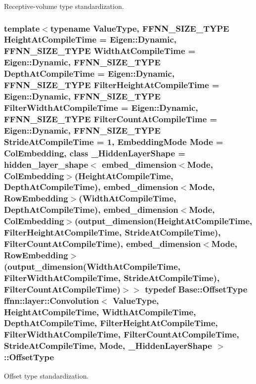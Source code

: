 Receptive-\/volume type standardization. 

\hypertarget{classffnn_1_1layer_1_1_convolution_a0ec0f3a4598c7286815f2fdd1e57e8ca}{
\subsubsection[{Offset\-Type}]{\setlength{\rightskip}{0pt plus 5cm}template$<$typename Value\-Type, F\-F\-N\-N\-\_\-\-S\-I\-Z\-E\-\_\-\-T\-Y\-P\-E Height\-At\-Compile\-Time = Eigen\-::\-Dynamic, F\-F\-N\-N\-\_\-\-S\-I\-Z\-E\-\_\-\-T\-Y\-P\-E Width\-At\-Compile\-Time = Eigen\-::\-Dynamic, F\-F\-N\-N\-\_\-\-S\-I\-Z\-E\-\_\-\-T\-Y\-P\-E Depth\-At\-Compile\-Time = Eigen\-::\-Dynamic, F\-F\-N\-N\-\_\-\-S\-I\-Z\-E\-\_\-\-T\-Y\-P\-E Filter\-Height\-At\-Compile\-Time = Eigen\-::\-Dynamic, F\-F\-N\-N\-\_\-\-S\-I\-Z\-E\-\_\-\-T\-Y\-P\-E Filter\-Width\-At\-Compile\-Time = Eigen\-::\-Dynamic, F\-F\-N\-N\-\_\-\-S\-I\-Z\-E\-\_\-\-T\-Y\-P\-E Filter\-Count\-At\-Compile\-Time = Eigen\-::\-Dynamic, F\-F\-N\-N\-\_\-\-S\-I\-Z\-E\-\_\-\-T\-Y\-P\-E Stride\-At\-Compile\-Time = 1, Embedding\-Mode Mode = Col\-Embedding, class \-\_\-\-Hidden\-Layer\-Shape = hidden\-\_\-layer\-\_\-shape$<$              embed\-\_\-dimension$<$\-Mode, Col\-Embedding$>$(\-Height\-At\-Compile\-Time, Depth\-At\-Compile\-Time),              embed\-\_\-dimension$<$\-Mode, Row\-Embedding$>$(\-Width\-At\-Compile\-Time,  Depth\-At\-Compile\-Time),              embed\-\_\-dimension$<$\-Mode, Col\-Embedding$>$(output\-\_\-dimension(\-Height\-At\-Compile\-Time, Filter\-Height\-At\-Compile\-Time, Stride\-At\-Compile\-Time), Filter\-Count\-At\-Compile\-Time),              embed\-\_\-dimension$<$\-Mode, Row\-Embedding$>$(output\-\_\-dimension(\-Width\-At\-Compile\-Time,  Filter\-Width\-At\-Compile\-Time,  Stride\-At\-Compile\-Time), Filter\-Count\-At\-Compile\-Time)$>$$>$ typedef {\bf Base\-::\-Offset\-Type} {\bf ffnn\-::layer\-::\-Convolution}$<$ Value\-Type, Height\-At\-Compile\-Time, Width\-At\-Compile\-Time, Depth\-At\-Compile\-Time, Filter\-Height\-At\-Compile\-Time, Filter\-Width\-At\-Compile\-Time, Filter\-Count\-At\-Compile\-Time, Stride\-At\-Compile\-Time, Mode, \-\_\-\-Hidden\-Layer\-Shape $>$\-::{\bf Offset\-Type}}}\label{classffnn_1_1layer_1_1_convolution_a0ec0f3a4598c7286815f2fdd1e57e8ca}


Offset type standardization. 

